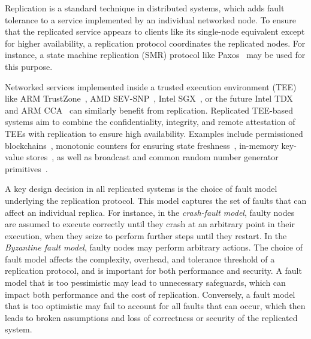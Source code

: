 

Replication is a standard technique in distributed systems, which adds
fault tolerance to a service implemented by an individual networked
node. To ensure that the replicated service appears to clients like
its single-node equivalent except for higher availability, a
replication protocol coordinates the replicated
nodes. For instance, a state machine replication (SMR) protocol like
Paxos~\cite{paxos} may be used for this purpose.

Networked services implemented inside a trusted execution environment
(TEE) like ARM TrustZone~\cite{armTZ}, AMD SEV-SNP~\cite{amdsev,
  amdsev-snp}, Intel SGX~\cite{intelsgx}, or the future Intel
TDX~\cite{inteltdx} and ARM CCA~\cite{arm-cca} can similarly benefit
from replication.  Replicated \ac{TEE}-based systems aim to combine the
confidentiality, integrity, and remote attestation of \acp{TEE} with
replication to ensure high availability.
Examples include permissioned blockchains~\cite{teechain}, monotonic
counters for ensuring state freshness~\cite{rote}, in-memory key-value
stores~\cite{avocado-atc21}, as well as broadcast and common random
number generator primitives~\cite{p2p-sgx}.

A key design decision in all replicated systems is the choice of fault
model underlying the replication protocol. This model captures the set
of faults that can affect an individual replica.  For instance, in the
{\em crash-fault model}, faulty nodes are assumed to execute correctly
until they crash at an arbitrary point in their execution, when they
seize to perform further steps until they restart. In the {\em
  Byzantine fault model}, faulty nodes may perform arbitrary
actions. The choice of fault model affects the complexity, overhead,
and tolerance threshold of a replication protocol, and is important
for both performance and security. A fault model that is too
pessimistic may lead to unnecessary safeguards, which can impact both
performance and the cost of replication. Conversely, a fault model
that is too optimistic may fail to account for all faults that can
occur, which then leads to broken assumptions and loss of correctness
or security of the replicated system.

